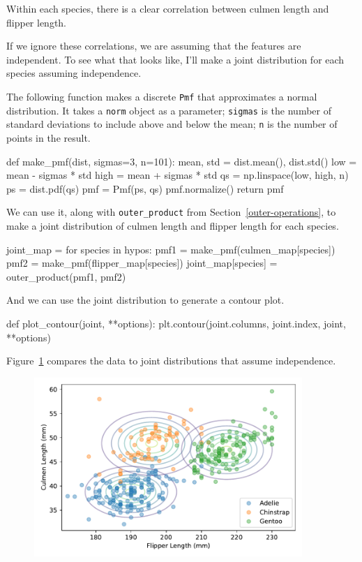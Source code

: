 \documentclass[12pt]{book}
\theoremstyle{exercise}
\newcommand{\py}[1]{{\tt #1}}%
\begin{document}
Within each species, there is a clear correlation between culmen length
and flipper length.

If we ignore these correlations, we are assuming that the features are
independent. To see what that looks like, I'll make a joint distribution
for each species assuming independence.

The following function makes a discrete \py{Pmf}
that approximates a normal distribution.
It takes a \py{norm} object as a parameter; \py{sigmas} is the number of standard deviations to include above and below the mean; \py{n} is the number of points in the result.

\begin{code}
def make_pmf(dist, sigmas=3, n=101):
    mean, std = dist.mean(), dist.std()
    low = mean - sigmas * std
    high = mean + sigmas * std
    qs = np.linspace(low, high, n)
    ps = dist.pdf(qs)
    pmf = Pmf(ps, qs)
    pmf.normalize()
    return pmf
\end{code}

We can use it, along with \py{outer_product} from Section~\ref{outer-operations}, to make a joint distribution of culmen length and
flipper length for each species.

\begin{code}
joint_map = {}
for species in hypos:
    pmf1 = make_pmf(culmen_map[species])
    pmf2 = make_pmf(flipper_map[species])
    joint_map[species] = outer_product(pmf1, pmf2)
\end{code}

And we can use the joint distribution to generate a contour plot.

\begin{code}
def plot_contour(joint, **options):
    plt.contour(joint.columns, joint.index, joint, **options)
\end{code}

Figure~\ref{fig10-03} compares the data to joint distributions that
assume independence.

\begin{figure}
\centerline{\includegraphics[width=4in]{figs/fig10-03.pdf}}
\caption{}
\label{fig10-03}
\end{figure}
\end{document}

